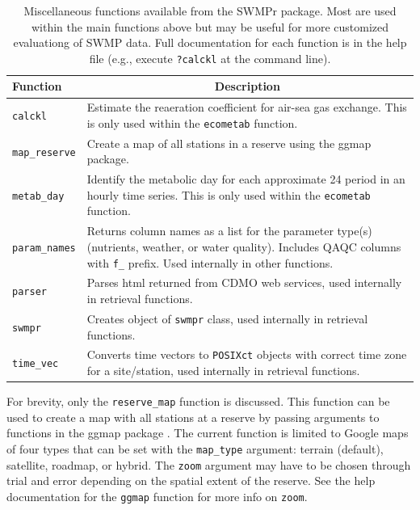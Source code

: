 \documentclass[10pt,letterpaper]{article}\usepackage[]{graphicx}\usepackage[]{color}
\begin{document}
\begin{table}[!tbp]
\caption{Miscellaneous functions available from the SWMPr package.  Most are used within the main functions above but may be useful for more customized evaluationg of \ac{SWMP} data.  Full documentation for each function is in the help file (e.g., execute \texttt{?calckl} at the command line).\label{tab:misc}} 
\begin{center}
\begin{tabular}{lp{3.5in}}
\hline\hline
\multicolumn{1}{l}{Function}&\multicolumn{1}{c}{Description}\tabularnewline
\hline
\texttt{calckl}&Estimate the reaeration coefficient for air-sea gas exchange.  This is only used within the \texttt{ecometab} function.\tabularnewline
\texttt{map\_reserve}&Create a map of all stations in a reserve using the ggmap package.\tabularnewline
\texttt{metab\_day}&Identify the metabolic day for each approximate 24 period in an hourly time series.  This is only used within the \texttt{ecometab} function.\tabularnewline
\texttt{param\_names}&Returns column names as a list for the parameter type(s) (nutrients, weather, or water quality).  Includes \ac{QAQC} columns with \texttt{f\_} prefix. Used internally in other functions.\tabularnewline
\texttt{parser}&Parses html returned from \ac{CDMO} web services, used internally in retrieval functions.\tabularnewline
\texttt{swmpr}&Creates object of \texttt{swmpr} class, used internally in retrieval functions.\tabularnewline
\texttt{time\_vec}&Converts time vectors to \texttt{POSIXct} objects with correct time zone for a site/station, used internally in retrieval functions.\tabularnewline
\hline
\end{tabular}\end{center}

\end{table}


For brevity, only the \texttt{reserve\_map} function is discussed.  This function can be used to create a map with all stations at a reserve by passing arguments to functions in the ggmap package \cite{ggmap13}. The current function is limited to Google maps of four types that can be set with the \texttt{map\_type} argument: terrain (default), satellite, roadmap, or hybrid.  The \texttt{zoom} argument may have to be chosen through trial and error depending on the spatial extent of the reserve.  See the help documentation for the \texttt{ggmap} function for more info on \texttt{zoom}.
\end{document}
